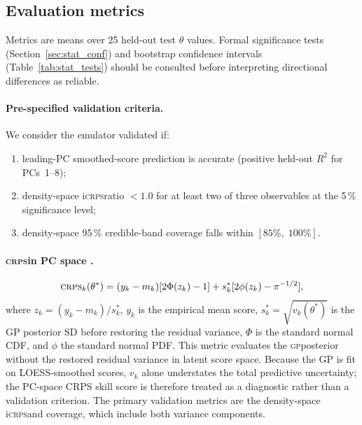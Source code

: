 \documentclass[12pt,a4paper]{article}
\newcommand{\GP}{\textsc{gp}}
\newcommand{\CRPS}{\textsc{crps}}
\newcommand{\iCRPS}{i\textsc{crps}}
\newcommand{\spar}{\theta}
\begin{document}
\subsection{Evaluation metrics}
\label{sec:metrics}

Metrics are means over 25 held-out test $\spar$ values.
Formal significance tests (Section~\ref{sec:stat_conf}) and bootstrap
confidence intervals (Table~\ref{tab:stat_tests}) should be consulted
before interpreting directional differences as reliable.

\paragraph{Pre-specified validation criteria.}
We consider the emulator validated if:
\begin{enumerate}
  \item[(a)] leading-PC smoothed-score prediction is accurate
             (positive held-out $R^2$ for PCs~1--8);
  \item[(b)] density-space \iCRPS ratio $<1.0$ for at least two of
             three observables at the 5\,\% significance level;
  \item[(c)] density-space 95\,\% credible-band coverage falls within
             $[85\%,\;100\%]$.
\end{enumerate}

\paragraph{\CRPS in PC space \citep{gneiting2007}.}
\begin{equation}
  \CRPS_k(\spar^*)=
    (y_k-m_k)[2\Phi(z_k)-1]
    +s_k^*[2\phi(z_k)-\pi^{-1/2}],
  \label{eq:crps}
\end{equation}
where $z_k=(y_k-m_k)/s_k^*$, $y_k$ is the empirical mean score,
$s_k^*=\sqrt{v_k(\spar^*)}$ is the GP posterior SD before restoring
the residual variance,
$\Phi$ is the standard normal CDF, and $\phi$ the standard normal PDF.
This metric evaluates the \GP posterior without the restored residual
variance in latent score space.  Because the GP is fit on
LOESS-smoothed scores, $v_k$ alone understates the total predictive
uncertainty; the PC-space CRPS skill score is therefore treated as a
diagnostic rather than a validation criterion.  The primary validation
metrics are the density-space \iCRPS and coverage, which include both
variance components.
\end{document}
